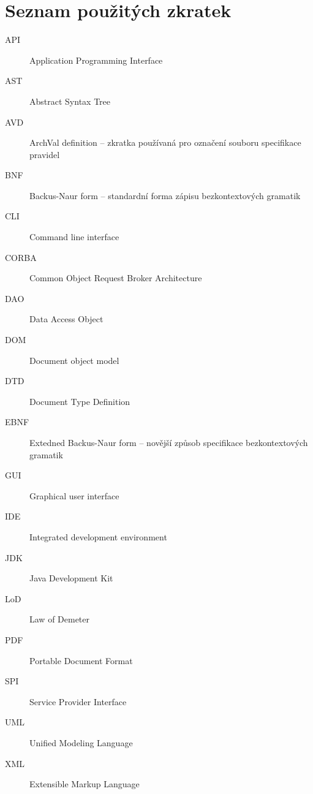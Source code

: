 \chapter{Seznam použitých zkratek}

\begin{description}
\item[API] Application Programming Interface
\item[AST] Abstract Syntax Tree
\item[AVD] ArchVal definition -- zkratka používaná pro označení souboru specifikace pravidel
\item[BNF] Backus-Naur form -- standardní forma zápisu bezkontextových gramatik
\item[CLI] Command line interface
\item[CORBA] Common Object Request Broker Architecture
\item[DAO] Data Access Object
\item[DOM] Document object model
\item[DTD] Document Type Definition
\item[EBNF] Extedned Backus-Naur form -- novější způsob specifikace bezkontextových gramatik
\item[GUI] Graphical user interface
\item[IDE] Integrated development environment
\item[JDK] Java Development Kit
\item[LoD] Law of Demeter
\item[PDF] Portable Document Format
\item[SPI] Service Provider Interface
\item[UML] Unified Modeling Language
\item[XML] Extensible Markup Language
\end{description}
